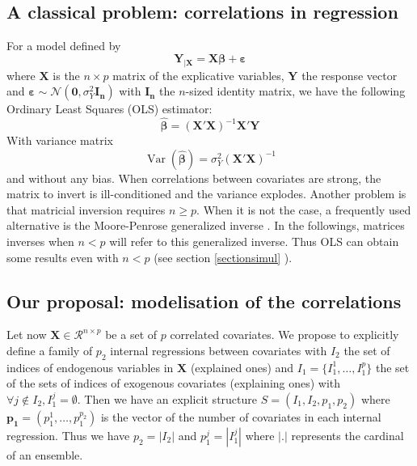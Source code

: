 \documentclass[11pt,a4paper]{article}
\begin{document}
\subsection{A classical problem: correlations in regression}\label{sectionOLS}
For a model defined by 
	\begin{equation}
		\boldsymbol{Y}_{|\boldsymbol{X}}=\boldsymbol{X\beta} + \boldsymbol{\varepsilon}
	\end{equation}
	where $\boldsymbol{X}$ is the $n\times p$ matrix of the explicative variables, $\boldsymbol{Y}$ the response vector and $\boldsymbol{\varepsilon} \sim \mathcal{N}(\boldsymbol{0},\sigma_Y^2\boldsymbol{I_n})$ with $\boldsymbol{I_n}$ the $n$-sized identity matrix,
	we have the following Ordinary Least Squares (\textsc{OLS}) estimator:
	\begin{equation}
		\boldsymbol{\hat{\beta}}=\left(\boldsymbol{X}'\boldsymbol{X} \right) ^{-1}\boldsymbol{X}'\boldsymbol{Y}
	\end{equation}
	With variance matrix
	\begin{equation}
		\operatorname{Var}(\boldsymbol{\hat{\beta}})=\sigma_Y^2\left(\boldsymbol{X}'\boldsymbol{X} \right) ^{-1} \label{eqOLS}
	\end{equation}
	and without any bias.
	When correlations between covariates are strong, the matrix to invert is ill-conditioned and the variance explodes.
	Another problem is that matricial inversion requires $n\geq p$. When it is not the case, a frequently used alternative is the Moore-Penrose generalized inverse \cite{katsikis2008fast}. In the followings, matrices inverses when $n<p$ will refer to this generalized inverse. Thus OLS can obtain some results even with $n<p$ (see section \ref{sectionsimul} ).
\subsection{Our proposal: modelisation of the correlations}
Let now $\boldsymbol{X} \in \mathcal{R}^{n\times p}$ be a set of $p$ correlated covariates.
We propose to explicitly define a family of $p_2$ internal regressions between covariates with $I_2$ the set of indices of endogenous variables in $\boldsymbol{X}$ (explained ones) and $I_1=\{I_1^1,\dots,I_1^p \}$ the set of the sets of indices of exogenous covariates (explaining ones) with $\forall j \notin I_2, I_1^j=\emptyset$. Then we have an explicit structure $S=(I_1,I_2,p_1,p_2)$ where $\boldsymbol{p_1}=(p_1^1,\dots,p_1^{p_2})$ is the vector of the number of covariates in each internal regression. Thus we have $p_2=|I_2|$ and $p_1^j=|I_1^j|$ where $|.|$ represents the cardinal of an ensemble.
\end{document}
